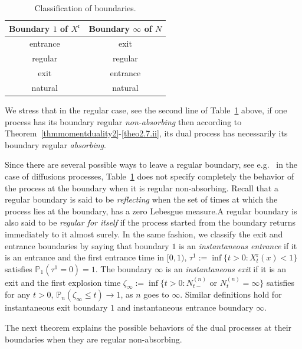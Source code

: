\documentclass[AHL,Unicode,longabstracts,published]{cedram}
\newcommand{\rmr}{\mathrm{r}}
\newcommand{\bbP}{\mathbb{P}}
\begin{document}
\begin{table}[htpb]
\caption{Classification of boundaries.}\label{correspondance}
\begin{center}
\begin{tabular}{|c|c|}
\hline Boundary $1$ of $X^{\rmr}$ & Boundary $\infty$ of $N$\\
\hline entrance & exit \\
\hline regular & regular \\
\hline exit & entrance \\
\hline natural & natural\\
\hline
\end{tabular}
\vspace*{2mm}
\end{center}
\end{table}

We stress that in the regular case, see the second line of Table~\ref{correspondance} above, if one process has its boundary regular \emph{non-absorbing} then according to Theorem~\ref{thmmomentduality2}-\eqref{theo2.7.ii}, its dual process has necessarily its boundary regular \emph{absorbing}.

Since there are several possible ways to leave a regular boundary, see e.g.~\cite[Chapter~15, Section~8]{MR611513} in the case of diffusions processes, Table~\ref{correspondance} does not specify completely the behavior of the process at the boundary when it is regular non-absorbing. Recall that a regular boundary is said to be \emph{reflecting} when the set of times at which the process lies at the boundary, has a zero Lebesgue measure.\linebreak A regular boundary is also said to be \emph{regular for itself} if the process started from the boundary returns immediately to it almost surely. In the same fashion, we classify the exit and entrance boundaries by saying that boundary $1$ is an \emph{instantaneous entrance} if it is an entrance and the first entrance time in $[0,1)$, $\tau^{1}:=\inf\{t>0: X^{\rmr}_t(x)<1\}$ satisfies $\bbP_1(\tau^{1}=0)=1$. The boundary $\infty$ is an \emph{instantaneous exit} if it is an exit and the first explosion time $\zeta_\infty:=\inf\{t>0: N^{(n)}_{t-} \text{ or } N^{(n)}_{t}=\infty\}$ satisfies for any $t>0$, $\bbP_n(\zeta_\infty \leq t)\longrightarrow 1$, as $n$ goes to $\infty$. Similar definitions hold for instantaneous exit boundary $1$ and instantaneous entrance boundary $\infty$.

The next theorem explains the possible behaviors of the dual processes at their boundaries when they are regular non-absorbing.
\end{document}
